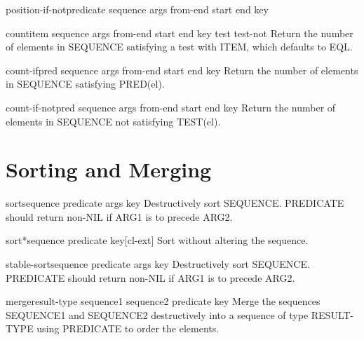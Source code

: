 \documentclass[10pt,english]{book}
\begin{document}
\begin{function}{position-if-not}{predicate sequence \rest args \key from-end start end key}
  
\end{function}

\begin{function}{count}{item sequence \rest args \key from-end start end key test test-not}
  Return the number of elements in SEQUENCE satisfying a test with ITEM,
  which defaults to EQL.
\end{function}

\begin{function}{count-if}{pred sequence \rest args \key from-end start end key}
  Return the number of elements in SEQUENCE satisfying PRED(el).
\end{function}

\begin{function}{count-if-not}{pred sequence \rest args \key from-end start end key}
  Return the number of elements in SEQUENCE not satisfying TEST(el).
\end{function}

\section{Sorting and Merging}
\label{sec:sorting-merging}

\begin{function}{sort}{sequence predicate \rest args \key key}
  Destructively sort SEQUENCE. PREDICATE should return non-NIL if
  ARG1 is to precede ARG2.
\end{function}

\begin{function}{sort*}{sequence predicate \key key}[cl-ext]
  Sort without altering the sequence.
\end{function}

\begin{function}{stable-sort}{sequence predicate \rest args \key key}
  Destructively sort SEQUENCE. PREDICATE should return non-NIL if
  ARG1 is to precede ARG2.
\end{function}

\begin{function}{merge}{result-type sequence1 sequence2 predicate \key key}
  Merge the sequences SEQUENCE1 and SEQUENCE2 destructively into a
  sequence of type RESULT-TYPE using PREDICATE to order the elements.
\end{function}
\end{document}
